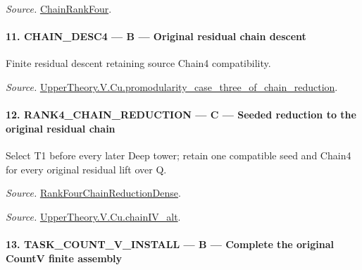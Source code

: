 \emph{Source.} \href{https://github.com/CocoSgt/riemann-hypothesis-lean/blob/7cbf7a0c32fca1badf05931879a37c3f8a2b03b4/src/Development/AutomorphicArithmetic/AutomorphicVarieties/ModularityArgument/ThresholdArguments/DenseThresholdCases/PromodularityCaseThree.lean#L26-L32}{ChainRankFour}.



\paragraph{11. CHAIN\_\allowbreak DESC4 — B — Original residual chain descent}

Finite residual descent retaining source Chain4 compatibility.

\emph{Source.} \href{https://github.com/CocoSgt/riemann-hypothesis-lean/blob/7cbf7a0c32fca1badf05931879a37c3f8a2b03b4/src/Development/AutomorphicArithmetic/AutomorphicVarieties/ModularityArgument/ThresholdArguments/DenseThresholdCases/PromodularityCaseThreeOfLemmas.lean#L131-L153}{UpperTheory.V.Cu.promodularity\_\allowbreak case\_\allowbreak three\_\allowbreak of\_\allowbreak chain\_\allowbreak reduction}.



\paragraph{12. RANK4\_\allowbreak CHAIN\_\allowbreak REDUCTION — C — Seeded reduction to the original residual chain}

Select T1 before every later Deep tower; retain one compatible seed and Chain4 for every original residual lift over Q.

\emph{Source.} \href{https://github.com/CocoSgt/riemann-hypothesis-lean/blob/7cbf7a0c32fca1badf05931879a37c3f8a2b03b4/src/Development/AutomorphicArithmetic/AutomorphicVarieties/ModularityArgument/ThresholdArguments/DenseThresholdCases/PromodularityCaseThree.lean#L33-L39}{RankFourChainReductionDense}.

\emph{Source.} \href{https://github.com/CocoSgt/riemann-hypothesis-lean/blob/7cbf7a0c32fca1badf05931879a37c3f8a2b03b4/src/Development/AutomorphicArithmetic/AutomorphicVarieties/ModularityArgument/ThresholdArguments/DenseThresholdCases/CuPChainIV.lean#L16-L82}{UpperTheory.V.Cu.chainIV\_\allowbreak alt}.



\paragraph{13. TASK\_\allowbreak COUNT\_\allowbreak V\_\allowbreak INSTALL — B — Complete the original CountV finite assembly}

